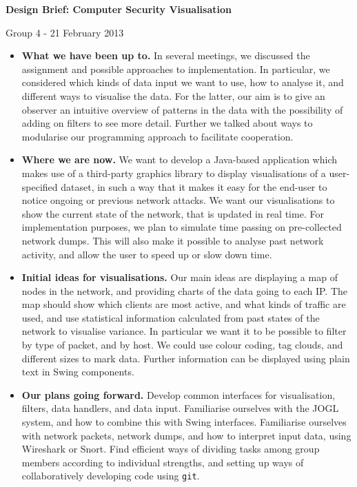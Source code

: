 \documentclass[12pt,a4paper]{article}
\begin{document}
	
	\begin{center}
		\textbf{Design Brief: Computer Security Visualisation}
		
		Group 4 - 21 February 2013
	\end{center}
	\bigskip \bigskip
	\begin{itemize}
		\item \textbf{What we have been up to.} In several meetings, we discussed the assignment and possible approaches to implementation. In particular, we considered which kinds of data input we want to use, how to analyse it, and different ways to visualise the data. For the latter, our aim is to give an observer an intuitive overview of patterns in the data with the possibility of adding on filters to see more detail. Further we talked about ways to modularise our programming approach to facilitate cooperation.
		\item \textbf{Where we are now.} We want to develop a Java-based application which makes use of a third-party graphics library to display visualisations of a user-specified dataset, in such a way that it makes it easy for the end-user to notice ongoing or previous network attacks. We want our visualisations to show the current state of the network, that is updated in real time. For implementation purposes, we plan to simulate time passing on pre-collected network dumps. This will also make it possible to analyse past network activity, and allow the user to speed up or slow down time. 
		\item \textbf{Initial ideas for visualisations.} Our main ideas are displaying a map of nodes in the network, and providing charts of the data going to each IP. The map should show which clients are most active, and what kinds of traffic are used, and use statistical information calculated from past states of the network to visualise variance. In particular we want it to be possible to filter by type of packet, and by host. We could use colour coding, tag clouds, and different sizes to mark data. Further information can be displayed using plain text in Swing components.
		\item \textbf{Our plans going forward.} Develop common interfaces for visualisation, filters, data handlers, and data input. Familiarise ourselves with the JOGL system, and how to combine this with Swing interfaces. Familiarise ourselves with network packets, network dumps, and how to interpret input data, using Wireshark or Snort. Find efficient ways of dividing tasks among group members according to individual strengths, and setting up ways of collaboratively developing code using \verb|git|.
	\end{itemize}
	
	
\end{document}

